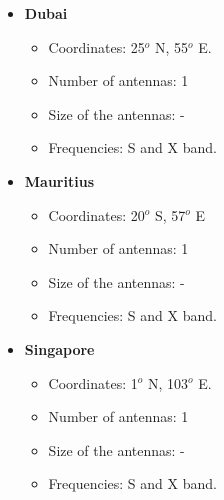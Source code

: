 \begin{itemize}
\begin{itemize}
\end{itemize}
\item \textbf{Dubai}
\begin{itemize}
\item Coordinates: 25$^{o}$ N, 55$^{o}$ E.
\item Number of antennas: 1
\item Size of the antennas: -
\item Frequencies: S and X band.
\end{itemize}
\item \textbf{Mauritius}
\begin{itemize}
\item Coordinates: 20$^{o}$ S, 57$^{o}$ E
\item Number of antennas: 1
\item Size of the antennas: -
\item Frequencies: S and X band.
\end{itemize}
\item \textbf{Singapore}
\begin{itemize}
\item Coordinates: 1$^{o}$ N, 103$^{o}$ E.
\item Number of antennas: 1
\item Size of the antennas: -
\item Frequencies: S and X band.
\end{itemize}
\end{itemize}

